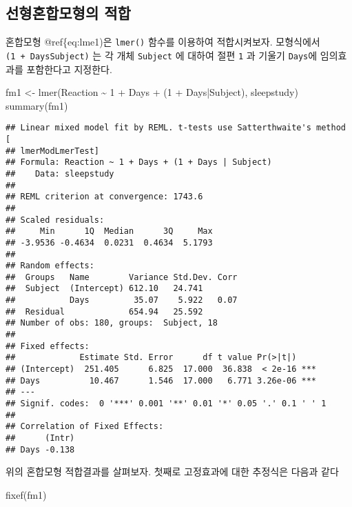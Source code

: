 \documentclass[
]{book}
\newenvironment{Shaded}{\begin{snugshade}}{\end{snugshade}}
\newcommand{\DecValTok}[1]{\textcolor[rgb]{0.00,0.00,0.81}{#1}}
\newcommand{\FunctionTok}[1]{\textcolor[rgb]{0.00,0.00,0.00}{#1}}
\newcommand{\NormalTok}[1]{#1}
\newcommand{\OtherTok}[1]{\textcolor[rgb]{0.56,0.35,0.01}{#1}}
\newcommand{\SpecialCharTok}[1]{\textcolor[rgb]{0.00,0.00,0.00}{#1}}
\begin{document}
\hypertarget{uxc120uxd615uxd63cuxd569uxbaa8uxd615uxc758-uxc801uxd569}{%
\subsection{선형혼합모형의 적합}\label{uxc120uxd615uxd63cuxd569uxbaa8uxd615uxc758-uxc801uxd569}}

혼합모형 @ref\{eq:lme1)은 \texttt{lmer()} 함수를 이용하여 적합시켜보자. 모형식에서 \texttt{(1\ +\ Days\textbar{}Subject)}
는 각 개체 \texttt{Subject} 에 대하여 절편 \texttt{1} 과 기울기 \texttt{Days}에 임의효과를 포함한다고 지정한다.

\begin{Shaded}
\begin{Highlighting}[]
\NormalTok{fm1 }\OtherTok{\textless{}{-}} \FunctionTok{lmer}\NormalTok{(Reaction }\SpecialCharTok{\textasciitilde{}} \DecValTok{1} \SpecialCharTok{+}\NormalTok{ Days }\SpecialCharTok{+}\NormalTok{ (}\DecValTok{1} \SpecialCharTok{+}\NormalTok{ Days}\SpecialCharTok{|}\NormalTok{Subject), sleepstudy)}
\FunctionTok{summary}\NormalTok{(fm1)}
\end{Highlighting}
\end{Shaded}

\begin{verbatim}
## Linear mixed model fit by REML. t-tests use Satterthwaite's method [
## lmerModLmerTest]
## Formula: Reaction ~ 1 + Days + (1 + Days | Subject)
##    Data: sleepstudy
## 
## REML criterion at convergence: 1743.6
## 
## Scaled residuals: 
##     Min      1Q  Median      3Q     Max 
## -3.9536 -0.4634  0.0231  0.4634  5.1793 
## 
## Random effects:
##  Groups   Name        Variance Std.Dev. Corr
##  Subject  (Intercept) 612.10   24.741       
##           Days         35.07    5.922   0.07
##  Residual             654.94   25.592       
## Number of obs: 180, groups:  Subject, 18
## 
## Fixed effects:
##             Estimate Std. Error      df t value Pr(>|t|)    
## (Intercept)  251.405      6.825  17.000  36.838  < 2e-16 ***
## Days          10.467      1.546  17.000   6.771 3.26e-06 ***
## ---
## Signif. codes:  0 '***' 0.001 '**' 0.01 '*' 0.05 '.' 0.1 ' ' 1
## 
## Correlation of Fixed Effects:
##      (Intr)
## Days -0.138
\end{verbatim}

위의 혼합모형 적합결과를 살펴보자. 첫째로 고정효과에 대한 추정식은 다음과 같다

\begin{Shaded}
\begin{Highlighting}[]
\FunctionTok{fixef}\NormalTok{(fm1)}
\end{Highlighting}
\end{Shaded}
\end{document}
